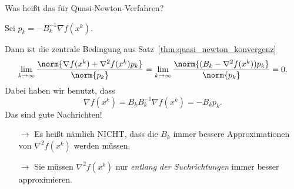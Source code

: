 Was heißt das für Quasi-Newton-Verfahren?

\medskip

Sei $p_k=-B_k^{-1} \nabla f(x^k)$.

\medskip

Dann ist die zentrale Bedingung aus Satz~\ref{thm:quasi_newton_konvergenz}
\begin{equation*}
 \lim_{k \to \infty} \frac{\norm{\nabla f(x^k)+\nabla^2 f(x^k )p_k}}{\norm{p_k}}
 =
 \lim_{k \to \infty} \frac{\norm{(B_k-\nabla^2f (x^k ) )p_k}}{\norm{p_k}}
 =
 0.
\end{equation*}
Dabei haben wir benutzt, dass
\begin{equation*}
 \nabla f (x^k )=B_kB_k^{-1} \nabla f (x^k )=-B_kp_k.
\end{equation*}
Das sind gute Nachrichten! \begin{itemize}
	\item[$\rightarrow$] Es heißt nämlich NICHT, dass die $B_k$ immer bessere Approximationen von $\nabla^2 f (x^k )$ werden müssen.
	\item[$\rightarrow$] Sie müssen $\nabla^2 f (x^k )$ nur \emph{entlang der Suchrichtungen} immer besser approximieren.
\end{itemize}
